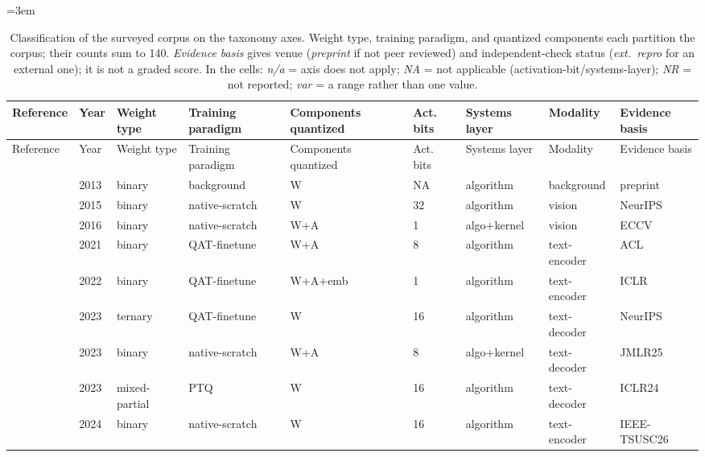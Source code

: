 \begin{landscape}
\begingroup\footnotesize\setlength{\tabcolsep}{4pt} \hfuzz=2pt \emergencystretch=3em
\begin{longtable}{p{3.2cm} p{1cm} p{1.9cm} p{2.2cm} p{2.2cm} p{1.3cm} p{2.2cm} p{2.1cm} p{2.5cm}}
\caption{Classification of the surveyed corpus on the taxonomy axes. Weight type, training paradigm, and quantized components each partition the corpus; their counts sum to 140. \emph{Evidence basis} gives venue (\emph{preprint} if not peer reviewed) and independent-check status (\emph{ext.\ repro} for an external one); it is not a graded score. In the cells: \emph{n/a} = axis does not apply; \emph{NA} = not applicable (activation-bit/systems-layer); \emph{NR} = not reported; \emph{var} = a range rather than one value.}\label{tab:classification}\\
\toprule Reference & Year & Weight type & Training paradigm & Components quantized & Act. bits & Systems layer & Modality & Evidence basis \\ \midrule \endfirsthead
\toprule Reference & Year & Weight type & Training paradigm & Components quantized & Act. bits & Systems layer & Modality & Evidence basis \\ \midrule \endhead
\bottomrule \endfoot
\citet{Bengio2013-STE} & 2013 & binary & background & W & NA & algorithm & background & preprint \\
\citet{Courbariaux2015-BinaryConnect} & 2015 & binary & native-scratch & W & 32 & algorithm & vision & Neur\allowbreak{}IPS \\
\citet{Rastegari2016-XNORNet} & 2016 & binary & native-scratch & W+\allowbreak{}A & 1 & algo+\allowbreak{}kernel & vision & ECCV \\
\citet{Bai2021-BinaryBERT} & 2021 & binary & QAT-finetune & W+\allowbreak{}A & 8 & algorithm & text-encoder & ACL \\
\citet{Qin2022-BiBERT} & 2022 & binary & QAT-finetune & W+\allowbreak{}A+\allowbreak{}emb & 1 & algorithm & text-encoder & ICLR \\
\citet{Kim2023-TSLD} & 2023 & ternary & QAT-finetune & W & 16 & algorithm & text-decoder & Neur\allowbreak{}IPS \\
\citet{Wang2023-BitNet} & 2023 & binary & native-scratch & W+\allowbreak{}A & 8 & algo+\allowbreak{}kernel & text-decoder & JMLR25 \\
\citet{Shang2023-PBLLM} & 2023 & mixed-partial & PTQ & W & 16 & algorithm & text-decoder & ICLR24 \\
\citet{Ansar2024-BEExformer} & 2024 & binary & native-scratch & W & 16 & algorithm & text-encoder & IEEE-TSUSC26 \\

\end{longtable}
\end{landscape}
